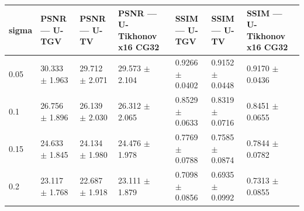 \begin{tabular}{lllllll}
\toprule
sigma & PSNR — U-TGV & PSNR — U-TV & PSNR — U-Tikhonov x16 CG32 & SSIM — U-TGV & SSIM — U-TV & SSIM — U-Tikhonov x16 CG32 \\
\midrule
0.05 & 30.333 $\pm$ 1.963 & 29.712 $\pm$ 2.071 & 29.573 $\pm$ 2.104 & 0.9266 $\pm$ 0.0402 & 0.9152 $\pm$ 0.0448 & 0.9170 $\pm$ 0.0436 \\
0.1 & 26.756 $\pm$ 1.896 & 26.139 $\pm$ 2.030 & 26.312 $\pm$ 2.065 & 0.8529 $\pm$ 0.0633 & 0.8319 $\pm$ 0.0716 & 0.8451 $\pm$ 0.0655 \\
0.15 & 24.633 $\pm$ 1.845 & 24.134 $\pm$ 1.980 & 24.476 $\pm$ 1.978 & 0.7769 $\pm$ 0.0788 & 0.7585 $\pm$ 0.0874 & 0.7844 $\pm$ 0.0782 \\
0.2 & 23.117 $\pm$ 1.768 & 22.687 $\pm$ 1.918 & 23.111 $\pm$ 1.879 & 0.7098 $\pm$ 0.0856 & 0.6935 $\pm$ 0.0992 & 0.7313 $\pm$ 0.0855 \\
\bottomrule
\end{tabular}
